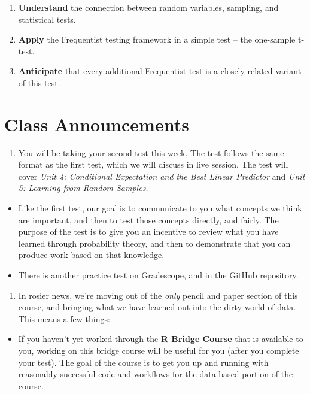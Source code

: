\documentclass[
]{book}
\providecommand{\tightlist}{%
  \setlength{\itemsep}{0pt}\setlength{\parskip}{0pt}}
\theoremstyle{definition}
\theoremstyle{definition}
\theoremstyle{definition}
\theoremstyle{definition}
\theoremstyle{remark}
\begin{document}
\begin{enumerate}
\def\labelenumi{\arabic{enumi}.}
\tightlist
\item
  \textbf{Understand} the connection between random variables, sampling, and statistical tests.
\item
  \textbf{Apply} the Frequentist testing framework in a simple test -- the one-sample t-test.
\item
  \textbf{Anticipate} that every additional Frequentist test is a closely related variant of this test.
\end{enumerate}

\hypertarget{class-announcements-4}{%
\section{Class Announcements}\label{class-announcements-4}}

\begin{enumerate}
\def\labelenumi{\arabic{enumi}.}
\tightlist
\item
  You will be taking your second test this week. The test follows the same format as the first test, which we will discuss in live session. The test will cover \emph{Unit 4: Conditional Expectation and the Best Linear Predictor} and \emph{Unit 5: Learning from Random Samples.}
\end{enumerate}

\begin{itemize}
\tightlist
\item
  Like the first test, our goal is to communicate to you what concepts we think are important, and then to test those concepts directly, and fairly. The purpose of the test is to give you an incentive to review what you have learned through probability theory, and then to demonstrate that you can produce work based on that knowledge.
\item
  There is another practice test on Gradescope, and in the GitHub repository.
\end{itemize}

\begin{enumerate}
\def\labelenumi{\arabic{enumi}.}
\setcounter{enumi}{1}
\tightlist
\item
  In rosier news, we're moving out of the \emph{only} pencil and paper section of this course, and bringing what we have learned out into the dirty world of data. This means a few things:
\end{enumerate}

\begin{itemize}
\tightlist
\item
  If you haven't yet worked through the \textbf{R Bridge Course} that is available to you, working on this bridge course will be useful for you (after you complete your test). The goal of the course is to get you up and running with reasonably successful code and workflows for the data-based portion of the course.
\end{itemize}
\end{document}
